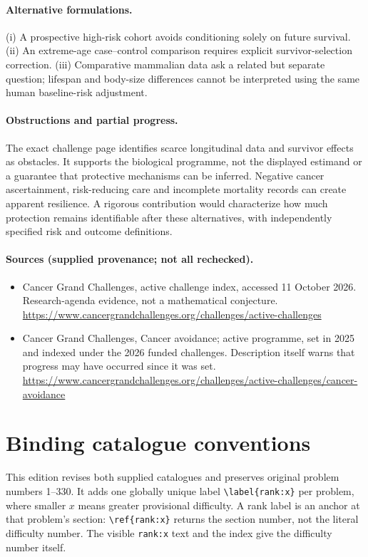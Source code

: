 \documentclass[11pt]{article}
\begin{document}
\paragraph{Alternative formulations.} (i) A prospective high-risk cohort avoids conditioning solely on future survival. (ii) An extreme-age case--control comparison requires explicit survivor-selection correction. (iii) Comparative mammalian data ask a related but separate question; lifespan and body-size differences cannot be interpreted using the same human baseline-risk adjustment.
\paragraph{Obstructions and partial progress.} The exact challenge page identifies scarce longitudinal data and survivor effects as obstacles. It supports the biological programme, not the displayed estimand or a guarantee that protective mechanisms can be inferred. Negative cancer ascertainment, risk-reducing care and incomplete mortality records can create apparent resilience. A rigorous contribution would characterize how much protection remains identifiable after these alternatives, with independently specified risk and outcome definitions.
\paragraph{Sources (supplied provenance; not all rechecked).}
\begin{itemize}
\item Cancer Grand Challenges, active challenge index, accessed 11 October 2026. Research-agenda evidence, not a mathematical conjecture. \url{https://www.cancergrandchallenges.org/challenges/active-challenges}
\item Cancer Grand Challenges, Cancer avoidance; active programme, set in 2025 and indexed under the 2026 funded challenges. Description itself warns that progress may have occurred since it was set. \url{https://www.cancergrandchallenges.org/challenges/active-challenges/cancer-avoidance}
\end{itemize}


\section*{Binding catalogue conventions}
This edition revises both supplied catalogues and preserves original problem numbers 1--330. It adds one globally unique label \verb|\label{rank:x}| per problem, where smaller $x$ means greater provisional difficulty. A rank label is an anchor at that problem's section: \verb|\ref{rank:x}| returns the section number, not the literal difficulty number. The visible \texttt{rank:x} text and the index give the difficulty number itself.
\end{document}
